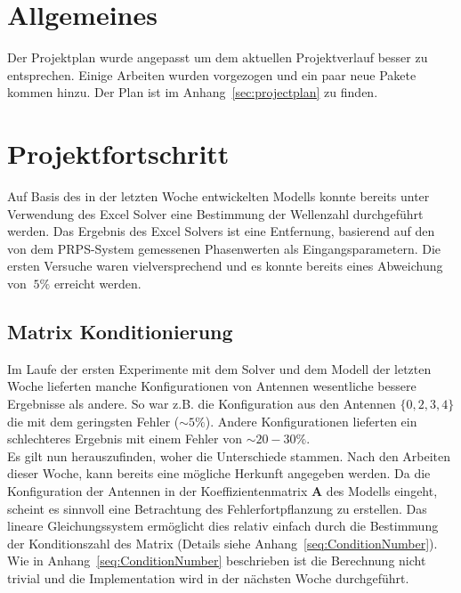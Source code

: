 \documentclass[a4paper,12pt,fleqn]{article}
\begin{document}
\setlength{\headheight}{36pt}

\begin{titlepage}



\end{titlepage}

\section[Allgemeines]{Allgemeines}
Der Projektplan wurde angepasst um dem aktuellen Projektverlauf besser zu entsprechen. Einige Arbeiten wurden vorgezogen und ein paar neue Pakete kommen hinzu. Der Plan ist im Anhang~\ref{sec:projectplan} zu finden.
%
\section[Fortschritt]{Projektfortschritt}
Auf Basis des in der letzten Woche entwickelten Modells konnte bereits unter Verwendung des Excel Solver eine Bestimmung der Wellenzahl durchgeführt werden. Das Ergebnis des Excel Solvers ist eine Entfernung, basierend auf den von dem PRPS-System gemessenen Phasenwerten als Eingangsparametern. Die ersten Versuche waren vielversprechend und es konnte bereits eines Abweichung von $~5\%$ erreicht werden.
%
\subsection{Matrix Konditionierung}
Im Laufe der ersten Experimente mit dem Solver und dem Modell der letzten Woche lieferten manche Konfigurationen von Antennen wesentliche bessere Ergebnisse als andere. So war z.B. die Konfiguration aus den Antennen $\{0,2,3,4\}$ die mit dem geringsten Fehler ($\sim5\%$). Andere Konfigurationen lieferten ein schlechteres Ergebnis mit einem Fehler von $\sim20-30\%$.\\
Es gilt nun herauszufinden, woher die Unterschiede stammen. Nach den Arbeiten dieser Woche, kann bereits eine mögliche Herkunft angegeben werden. Da die Konfiguration der Antennen in der Koeffizientenmatrix $\mathbf{A}$ des Modells eingeht, scheint es sinnvoll eine Betrachtung des Fehlerfortpflanzung zu erstellen. Das lineare Gleichungssystem ermöglicht dies relativ einfach durch die Bestimmung der Konditionszahl des Matrix (Details siehe Anhang~\ref{seq:ConditionNumber}).\\
Wie in Anhang~\ref{seq:ConditionNumber} beschrieben ist die Berechnung nicht trivial und die Implementation wird in der nächsten Woche durchgeführt.
%
\end{document}
